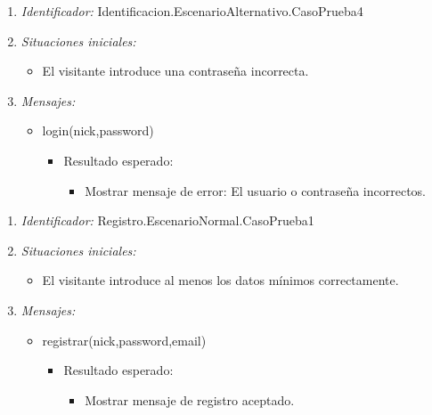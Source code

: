 \begin{enumerate}
	\item {\it Identificador:} Identificacion.EscenarioAlternativo.CasoPrueba4
	\item {\it Situaciones iniciales:}
    		\begin{itemize}
    			\item El visitante introduce una contraseña incorrecta.
		\end{itemize}
	\item {\it Mensajes:}
		\begin{itemize}
			\item login(nick,password)
				 \begin{itemize}
					 	\item Resultado esperado:
					 \begin{itemize}
					 	 \item Mostrar mensaje de error: El usuario o contraseña incorrectos.
					 \end{itemize}
				 \end{itemize}
		\end{itemize}
\end{enumerate}


\begin{enumerate}
	\item {\it Identificador:} Registro.EscenarioNormal.CasoPrueba1
	\item {\it Situaciones iniciales:}
    		\begin{itemize}
    			\item El visitante introduce al menos los datos mínimos correctamente.
		\end{itemize}
	\item {\it Mensajes:}
		\begin{itemize}
			\item registrar(nick,password,email)
				 \begin{itemize}
					 	\item Resultado esperado:
					 \begin{itemize}
					 	 \item Mostrar mensaje de registro aceptado.
					 \end{itemize}
				 \end{itemize}
		\end{itemize}
\end{enumerate}

